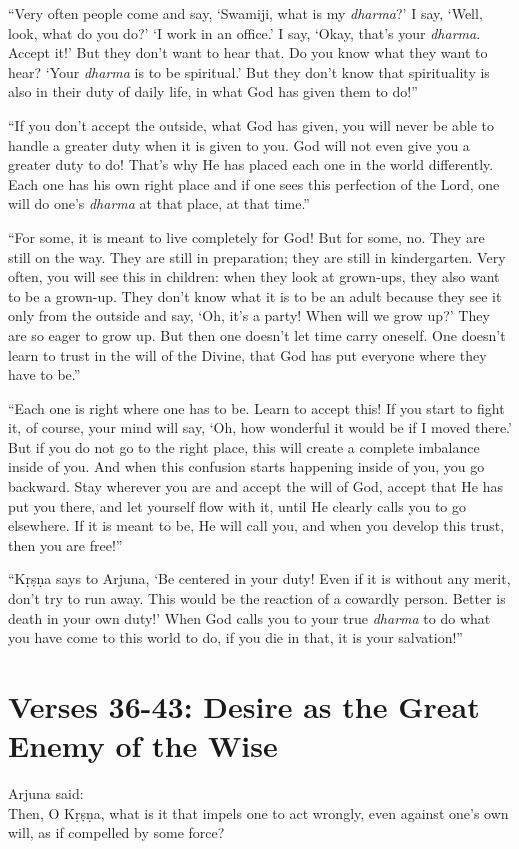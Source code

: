 \enquote{Very often people come and say, \enquote{Swamiji, what is my \textit{dharma}?} I say, \enquote{Well, look, what do you do?} \enquote{I work in an office.} I say, \enquote{Okay, that’s your \textit{dharma}. Accept it!} But they don’t want to hear that. Do you know what they want to hear? \enquote{Your \textit{dharma} is to be spiritual.} But they don’t know that spirituality is also in their duty of daily life, in what God has given them to do!}

\enquote{If you don’t accept the outside, what God has given, you will never be able to handle a greater duty when it is given to you. God will not even give you a greater duty to do! That’s why He has placed each one in the world differently. Each one has his own right place and if one sees this perfection of the Lord, one will do one’s \textit{dharma} at that place, at that time.}

\enquote{For some, it is meant to live completely for God! But for some, no. They are still on the way. They are still in preparation; they are still in kindergarten. Very often, you will see this in children: when they look at grown-ups, they also want to be a grown-up. They don’t know what it is to be an adult because they see it only from the outside and say, \enquote{Oh, it’s a party! When will we grow up?} They are so eager to grow up. But then one doesn’t let time carry oneself. One doesn’t learn to trust in the will of the Divine, that God has put everyone where they have to be.}

\enquote{Each one is right where one has to be. Learn to accept this! If you start to fight it, of course, your mind will say, \enquote{Oh, how wonderful it would be if I moved there.} But if you do not go to the right place, this will create a complete imbalance inside of you. And when this confusion starts happening inside of you, you go backward. Stay wherever you are and accept the will of God, accept that He has put you there, and let yourself flow with it, until He clearly calls you to go elsewhere. If it is meant to be, He will call you, and when you develop this trust, then you are free!}

\enquote{Kṛṣṇa says to Arjuna, \enquote{Be centered in your duty! Even if it is without any merit, don’t try to run away. This would be the reaction of a cowardly person. Better is death in your own duty!} When God calls you to your true \textit{dharma} to do what you have come to this world to do, if you die in that, it is your salvation!}

\section{Verses 36-43: Desire as the Great Enemy of the Wise}\label{sec-verses-36-43-desire-as-the-great-enemy-of-the-wise}
{\hspace*{1em}Arjuna said: \\
Then, O Kṛṣṇa, what is it that impels one to act wrongly, even against one’s own will, as if compelled by some force?}

